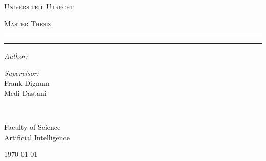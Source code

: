 \makeatletter
\begin{titlepage}
\begin{center}

\vspace*{.06\textheight}
{\scshape\LARGE Universiteit Utrecht\par}\vspace{1.5cm} %
\textsc{\Large Master Thesis}\\[0.5cm] %

\hrule
{\huge \bfseries \@title \par}\vspace{0.4cm} %
\hrule

\begin{minipage}[t]{0.4\textwidth}
\begin{flushleft} \large
\emph{Author:}\\
\@author %
\end{flushleft}
\end{minipage}
\begin{minipage}[t]{0.4\textwidth}
\begin{flushright} \large
\emph{Supervisor:} \\
Frank Dignum \\
Medi Dastani
\end{flushright}
\end{minipage}\\[3cm]
 
\vfill

Faculty of Science \\
Artificial Intelligence\\[2cm] %
 
\vfill

{\large \today}\\[4cm] %
 
\vfill
\end{center}
\end{titlepage}
\makeatother